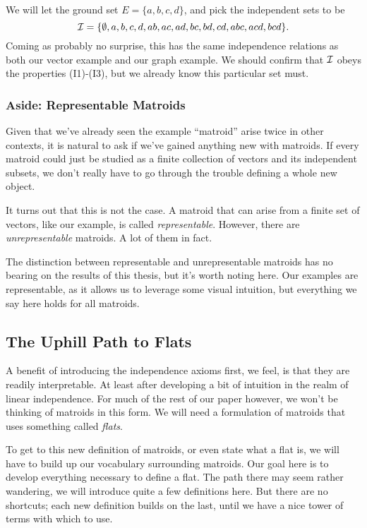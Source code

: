 \documentclass[12pt,oneside]{../../sfsuthesis}
\begin{document}
We will let the ground set \( E = \{ a, b, c, d \} \), and pick the independent sets to be
\[
    \mathcal{I} = \{
    \emptyset,
    a, b, c, d,
    ab, ac, ad, bc, bd, cd,
    abc, acd, bcd
    \}.
\]
Coming as probably no surprise, this has the same independence relations as both our vector example and our graph example.
We should confirm that \( \mathcal{I} \) obeys the properties (I1)-(I3), but we already know this particular set must.


\subsubsection{Aside: Representable Matroids}
Given that we've already seen the example ``matroid'' arise twice in other contexts, it is natural to ask if we've gained anything new with matroids.
If every matroid could just be studied as a finite collection of vectors and its independent subsets, we don't really have to go through the trouble defining a whole new object.

It turns out that this is not the case.
A matroid that can arise from a finite set of vectors, like our example, is called \emph{representable}.
However, there are \emph{unrepresentable} matroids.
A lot of them in fact.

The distinction between representable and unrepresentable matroids has no bearing on the results of this thesis, but it's worth noting here.
Our examples are representable, as it allows us to leverage some visual intuition, but everything we say here holds for all matroids.

\subsection{The Uphill Path to Flats}

A benefit of introducing the independence axioms first, we feel, is that they are readily interpretable.
At least after developing a bit of intuition in the realm of linear independence.
For much of the rest of our paper however, we won't be thinking of matroids in this form.
We will need a formulation of matroids that uses something called \emph{flats}.

To get to this new definition of matroids, or even state what a flat is, we will have to build up our vocabulary surrounding matroids.
Our goal here is to develop everything necessary to define a flat.
The path there may seem rather wandering, we will introduce quite a few definitions here.
But there are no shortcuts; each new definition builds on the last, until we have a nice tower of terms with which to use.
\end{document}
